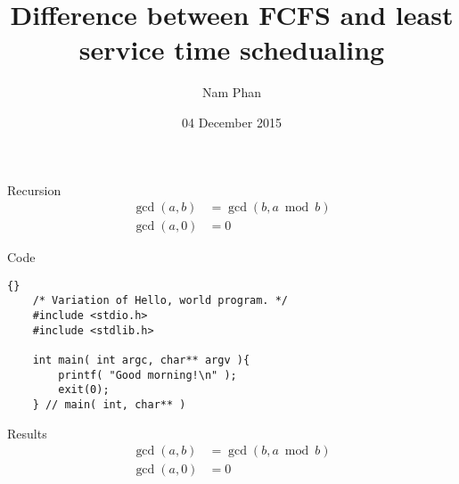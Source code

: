 \documentclass{beamer}
\title{Difference between FCFS and least service time schedualing}
\author{Nam Phan}
\institute{Cornell College}
\date{04 December 2015}
\begin{document}
\begin{frame}
  \titlepage
\end{frame}

\begin{frame}{Recursion}
\begin{align*}
  \gcd (a, b) & = \gcd( b, a \bmod b ) \\
  \gcd( a, 0 ) & = 0
  \end{align*}
\end{frame}

\begin{frame}[fragile]{Code}

  \begin{lstlisting}{}
    /* Variation of Hello, world program. */
    #include <stdio.h>
    #include <stdlib.h>

    int main( int argc, char** argv ){
        printf( "Good morning!\n" );
        exit(0);
    } // main( int, char** )
    \end{lstlisting}

\end{frame}

\begin{frame}{Results}
\begin{align*}
  \gcd (a, b) & = \gcd( b, a \bmod b ) \\
  \gcd( a, 0 ) & = 0
  \end{align*}
\end{frame}
\end{document}
